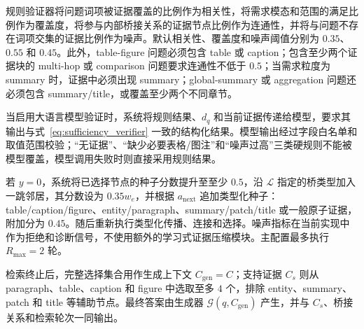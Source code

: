 规则验证器将问题词项被证据覆盖的比例作为相关性，将需求模态和范围的满足比例作为覆盖度，将参与内部桥接关系的证据节点比例作为连通性，并将与问题不存在词项交集的证据比例作为噪声。默认相关性、覆盖度和噪声阈值分别为 $0.35$、$0.55$ 和 $0.45$。此外，table-figure 问题必须包含 table 或 caption；包含至少两个证据块的 multi-hop 或 comparison 问题要求连通性不低于 $0.5$；当需求粒度为 summary 时，证据中必须出现 summary；global-summary 或 aggregation 问题还必须包含 summary/title，或覆盖至少两个不同章节。

当启用大语言模型验证时，系统将规则结果、$d_q$ 和当前证据传递给模型，要求其输出与式~\eqref{eq:sufficiency_verifier} 一致的结构化结果。模型输出经过字段白名单和取值范围校验；``无证据''、``缺少必要表格/图注''和``噪声过高''三类硬规则不能被模型覆盖，模型调用失败时则直接采用规则结果。

若 $y=0$，系统将已选择节点的种子分数提升至至少 $0.5$，沿 $\mathcal{L}$ 指定的桥类型加入一跳邻居，其分数设为 $0.35w_e$，并根据 $a_{\mathrm{next}}$ 追加类型化种子：table/caption/figure、entity/paragraph、summary/patch/title 或一般原子证据，附加分为 $0.45$。随后重新执行类型化传播、连接和选择。噪声指标在当前实现中作为拒绝和诊断信号，不使用额外的学习式证据压缩模块。主配置最多执行 $R_{\max}=2$ 轮。

检索终止后，完整选择集合用作生成上下文 $C_{\mathrm{gen}}=C$；支持证据 $C_s$ 则从 paragraph、table、caption 和 figure 中选取至多 $4$ 个，排除 entity、summary、patch 和 title 等辅助节点。最终答案由生成器 $\mathcal{G}(q,C_{\mathrm{gen}})$ 产生，并与 $C_s$、桥接关系和检索轮次一同输出。

